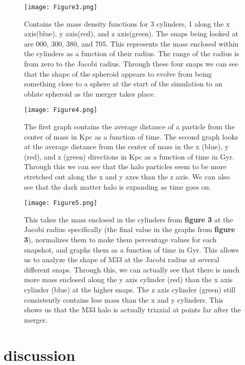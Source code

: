 \documentclass[fleqn,usenatbib]{mnras}
\begin{document}
\begin{figure}
                \centering
                \texttt{[image: Figure3.png]}
                \label{fig:enter-label}
            \caption{Contains the mass density functions for 3 cylinders, 1 along the x axis(blue), y axis(red), and z axis(green). The snaps being looked at are 000, 300, 380, and 705. This represents the mass enclosed within the cylinders as a function of their radius. The range of the radius is from zero to the Jacobi radius. Through these four snaps we can see that the shape of the spheroid appears to evolve from being something close to a sphere at the start of the simulation to an oblate spheroid as the merger takes place.}
            \end{figure}
\begin{figure}
                \centering
                \texttt{[image: Figure4.png]}
                \label{fig:enter-label}
            \caption{The first graph contains the average distance of a particle from the center of mass in Kpc as a function of time. The second graph looks at the average distance from the center of mass in the x (blue), y (red), and z (green) directions in Kpc as a function of time in Gyr. Through this we can see that the halo particles seem to be more stretched out along the x and y axes than the z axis. We can also see that the dark matter halo is expanding as time goes on.}
            \end{figure}
\begin{figure}
                \centering
                \texttt{[image: Figure5.png]}
                \label{fig:enter-label}
            \caption{This takes the mass enclosed in the cylinders from \textbf{figure 3} at the Jacobi radius specifically (the final value in the graphs from \textbf{figure 3}), normalizes them to make them percentage values for each snapshot, and graphs them as a function of time in Gyr. This allows us to analyze the shape of M33 at the Jacobi radius at several different snaps. Through this, we can actually see that there is much more mass enclosed along the y axis cylinder (red) than the x axis cylinder (blue) at the higher snaps. The z axis cylinder (green) still consistently contains less mass than the x and y cylinders. This shows us that the M33 halo is actually triaxial at points far after the merger.}
            \end{figure}
\section{discussion}
\end{document}
